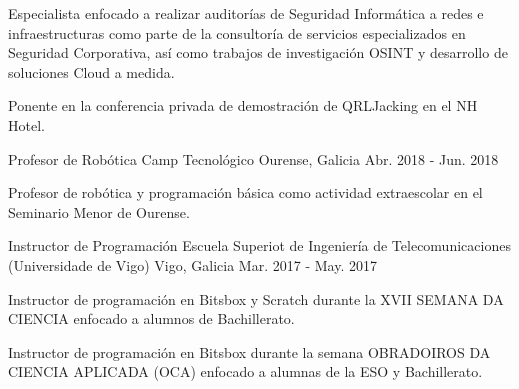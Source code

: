 \documentclass[11pt, a4paper]{style}
\begin{document}
\begin{cventries}
    {
      \begin{cvitems} %
        \item {Especialista enfocado a realizar auditorías de Seguridad Informática a redes e infraestructuras como parte de la consultoría de servicios especializados en Seguridad Corporativa, así como trabajos de investigación OSINT y desarrollo de soluciones Cloud a medida.}
        \item {Ponente en la conferencia privada de demostración de QRLJacking en el NH Hotel.}
      \end{cvitems}
    }
  \cventry
    {Profesor de Robótica} %
    {Camp Tecnológico} %
    {Ourense, Galicia} %
    {Abr. 2018 - Jun. 2018} %
    {
      \begin{cvitems} %
        \item {Profesor de robótica y programación básica como actividad extraescolar en el Seminario Menor de Ourense.}
      \end{cvitems}
    }
  \cventry
    {Instructor de Programación} %
    {Escuela Superiot de Ingeniería de Telecomunicaciones (Universidade de Vigo)} %
    {Vigo, Galicia} %
    {Mar. 2017 - May. 2017} %
    {
      \begin{cvitems} %
        \item {Instructor de programación en Bitsbox y Scratch durante la XVII SEMANA DA CIENCIA enfocado a alumnos de Bachillerato.}
        \item {Instructor de programación en Bitsbox durante la semana OBRADOIROS DA CIENCIA APLICADA (OCA) enfocado a alumnas de la ESO y Bachillerato.}
      \end{cvitems}
    }
\end{cventries}
\end{document}
